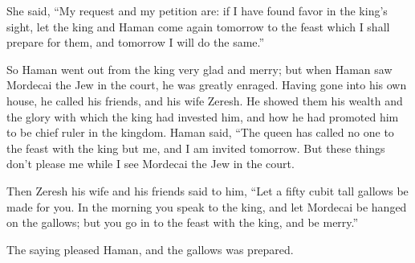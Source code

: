 {\par }{\PP {}She said, “My request and my petition are:
if I have found favor in the king’s sight, let the king and Haman come again tomorrow to the feast which I shall prepare for them, and tomorrow I will do the same.”
\par }{\PP {}So Haman went out from the king very glad and merry; but when Haman saw Mordecai the Jew in the court, he was greatly enraged.
Having gone into his own house, he called his friends, and his wife Zeresh.
He showed them his wealth and the glory with which the king had invested him, and how he had promoted him to be chief ruler in the kingdom.
Haman said, “The queen has called no one to the feast with the king but me, and I am invited tomorrow.
But these things don’t please me while I see Mordecai the Jew in the court.
\par }{\PP {}Then Zeresh his wife and his friends said to him, “Let a fifty cubit tall
 gallows be made for you. In the morning you speak to the king, and let Mordecai be hanged on the gallows; but you go in to the feast with the king, and be merry.”
\par }{\PP The saying pleased Haman, and the gallows was prepared.

}
